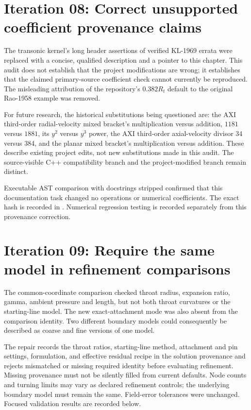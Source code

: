 \section{Iteration 08: Correct unsupported coefficient provenance claims}
The transonic kernel's long header assertions of verified
KL-1969 errata were replaced with a concise, qualified description and a
pointer to this chapter. This audit does not establish that the project modifications are
wrong; it establishes that the claimed primary-source coefficient check
cannot currently be reproduced. The misleading attribution of the
repository's $0.382R_t$ default to the original Rao-1958 example was removed.

For future research, the historical substitutions being questioned are:
the AXI third-order radial-velocity mixed bracket's multiplication versus
addition, $1181$ versus $1881$, its $y^2$ versus $y^3$ power, the AXI
third-order axial-velocity divisor 34 versus 384, and the planar mixed
bracket's multiplication versus addition. These describe existing project
edits, not new substitutions made in this audit. The source-visible C++
compatibility branch and the project-modified branch remain distinct.

Executable AST comparison with docstrings stripped confirmed that this
documentation task changed no operations or numerical coefficients.
The exact hash is recorded in . Numerical
regression testing is recorded separately from this provenance correction.

\section{Iteration 09: Require the same model in refinement comparisons}
The common-coordinate comparison checked throat radius,
expansion ratio, gamma, ambient pressure and length, but not both throat
curvatures or the starting-line model. The new exact-attachment mode was
also absent from the comparison identity. Two different boundary models
could consequently be described as coarse and fine versions of one model.

The repair records the throat ratios, starting-line method,
attachment and pin settings, formulation, and effective residual recipe
in the solution provenance and rejects mismatched or missing required
identity before evaluating refinement. Missing provenance must not be
silently filled from current defaults. Node counts and turning limits
may vary as declared refinement controls; the underlying boundary model
must remain the same. Field-error tolerances were unchanged.
Focused validation results are recorded below.

